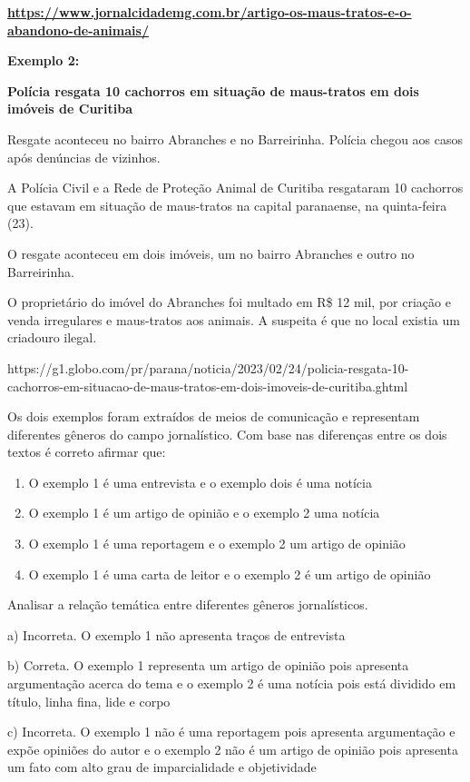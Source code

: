 \href{https://www.jornalcidademg.com.br/artigo-os-maus-tratos-e-o-abandono-de-animais/}{\textbf{{https://www.jornalcidademg.com.br/artigo-os-maus-tratos-e-o-abandono-de-animais/}}}

\textbf{Exemplo 2:}

\textbf{Polícia resgata 10 cachorros em situação de maus-tratos em dois
imóveis de Curitiba}

Resgate aconteceu no bairro Abranches e no Barreirinha. Polícia chegou
aos casos após denúncias de vizinhos.

A Polícia Civil e a Rede de Proteção Animal de Curitiba resgataram 10
cachorros que estavam em situação de maus-tratos na capital paranaense,
na quinta-feira (23).

O resgate aconteceu em dois imóveis, um no bairro Abranches e outro no
Barreirinha.

O proprietário do imóvel do Abranches foi multado em R\$ 12 mil, por
criação e venda irregulares e maus-tratos aos animais. A suspeita é que
no local existia um criadouro ilegal.

https://g1.globo.com/pr/parana/noticia/2023/02/24/policia-resgata-10-cachorros-em-situacao-de-maus-tratos-em-dois-imoveis-de-curitiba.ghtml

Os dois exemplos foram extraídos de meios de comunicação e representam
diferentes gêneros do campo jornalístico. Com base nas diferenças entre
os dois textos é correto afirmar que:

\begin{enumerate}
\def\labelenumi{\alph{enumi})}
\item
  O exemplo 1 é uma entrevista e o exemplo dois é uma notícia
\item
  O exemplo 1 é um artigo de opinião e o exemplo 2 uma notícia
\item
  O exemplo 1 é uma reportagem e o exemplo 2 um artigo de opinião
\item
  O exemplo 1 é uma carta de leitor e o exemplo 2 é um artigo de opinião
\end{enumerate}

Analisar a relação temática entre diferentes gêneros jornalísticos.

a) Incorreta. O exemplo 1 não apresenta traços de entrevista

b) Correta. O exemplo 1 representa um artigo de opinião pois apresenta
argumentação acerca do tema e o exemplo 2 é uma notícia pois está
dividido em título, linha fina, lide e corpo

c) Incorreta. O exemplo 1 não é uma reportagem pois apresenta
argumentação e expõe opiniões do autor e o exemplo 2 não é um artigo de
opinião pois apresenta um fato com alto grau de imparcialidade e
objetividade

